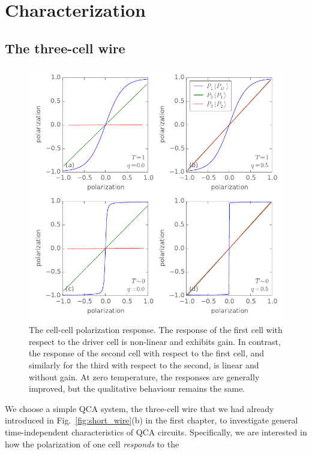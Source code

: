 \chapter{Characterization}
\graphicspath{{../gfx/chapter03/}{../plots/chapter03/}}


\section{The three-cell wire}

%
\begin{figure}
  \center
  \includegraphics{three_cells_PP}
  \caption{
  The cell-cell polarization response. The response of the first cell with
  respect to the driver cell is non-linear and exhibits gain. In contrast, the
  response of the second cell with respect to the first cell, and similarly
  for the third with respect to the second, is linear and without gain. At zero
  temperature, the responses are generally improved, but the qualitative
  behaviour remains the same.
  }
  \label{fig:three_cells_PP}
\end{figure}
%
We choose a simple QCA system, the three-cell wire that we had already
introduced in Fig.~\ref{fig:short_wire}(b) in the first chapter, to investigate
general time-independent characteristics of QCA circuits. Specifically, we are
interested in how the polarization of one cell \emph{responds} to the
